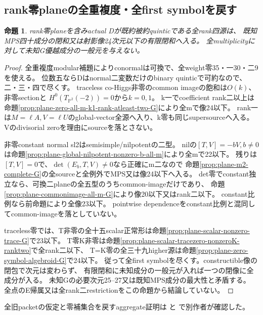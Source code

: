 \documentclass[a4paper,11pt]{ltjsarticle}
\newtheorem{proposition}{命題}[section]
\theoremstyle{definition}
\begin{document}
\subsection{rank零planeの全重複度・全first symbolを戻す}
\begin{proposition}\label{prop:plane-rankzero-all-G}
rank零planeを含みactual Dが既約被約quinticである全rank四源は、
既知MPS四十成分の閉和又は射影像24次元以下の有限閉和へ入る。
全multiplicityに対して未知G優越成分の一般元を与えない。
\end{proposition}
\begin{proof}
全重複度modular補題によりconormalは可換で、全weight零35・一30・二9を使える。
位数五ならDはnormal二変数だけのbinary quinticで可約なので、二・三・四で尽くす。
traceless co-Higgs非零のcommon imageの飽和は$O(k)$、非零sectionと
$H^0(T_{\mathbb P^2}(-2))=0$から$k=0,1$。
k一でcoefficient rank二以上は命題\ref{prop:plane-zero-all-m-k1-rank-atleast-two-G}により全mで像24以下。
rank一は$M=\ell A,V=\ell U$のglobal-vector全源へ入り、k零も同じsupersourceへ入る。
Vのdivisorial zeroを理由にsourceを落とさない。

非零constant normal sl2はsemisimple/nilpotentの二型。
nilの$[T,V]=-bV,b\ne0$は命題\ref{prop:plane-global-nilpotent-nonzero-b-all-m}により全mで22以下。
残りは$[T,V]=0$で、$\det(E_b,T,V)\ne0$なら正確にm二なので
命題\ref{prop:plane-m2-complete-G}の全sourceと全例外でMPS又は像24以下へ入る。
det零でconstant独立なら、可換二planeの全五型のうちcommon-imageだけであり、
命題\ref{prop:plane-commonimage-all-m-G}により像20以下又はrank二以下。
constant比例なら前命題により全像23以下。
pointwise dependenceをconstant比例と混同してcommon-imageを落としていない。

traceless零では、T非零の全十五scalar正常形は命題\ref{prop:plane-scalar-nonzero-trace-G}で23以下。
T零K非零は命題\ref{prop:plane-scalar-tracezero-nonzeroK-ranktwo}で全rank二以下、
T=K零の全三十九higher源は命題\ref{prop:plane-zero-symbol-algebroid-G}で24以下。
従って全first symbolを尽くす。constructible像の閉包で次元は変わらず、
有限閉和に未知成分の一般元が入れば一つの閉像に全成分が入る。
未知Gの必要次元25--27又は既知MPS成分の最大性と矛盾する。
全点のE帰属又は全rank二restrictionをこの命題から結論していない。
\end{proof}
全旧packetの仮定と零補集合を戻すaggregate証明は
と
で別作者が確認した。
\end{document}
